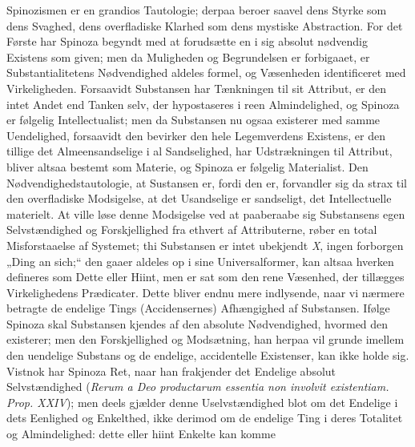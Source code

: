 \documentclass[12pt]{book}
\newcommand{\opage}[1]{\marginnote{\footnotesize\textit{[#1]}}}
\begin{document}
Spinozismen er en grandios Tautologie; derpaa beroer saavel dens Styrke som dens
Svaghed, dens overfladiske Klarhed som dens mystiske Abstraction. For det Første har
Spinoza begyndt med at forudsætte en i sig absolut nødvendig Existens som given; men da
Muligheden og Begrundelsen er forbigaaet, er Substantialitetens Nødvendighed aldeles
formel, og Væsenheden identificeret med Virkeligheden. Forsaavidt Substansen har
Tænkningen til sit Attribut, er den intet Andet end Tanken selv, der hypostaseres i
reen Almindelighed, og Spinoza er følgelig Intellectualist; men da Substansen nu ogsaa
existerer med samme Uendelighed, forsaavidt den bevirker den hele Legemverdens
Existens, er den tillige det Almeensandselige i al Sandselighed, har Udstrækningen
\opage{165} %
til Attribut, bliver altsaa bestemt som Materie, og Spinoza er følgelig Materialist.
Den Nødvendighedstautologie, at Sustansen er, fordi den er, forvandler sig da strax til
den overfladiske Modsigelse, at det Usandselige er sandseligt, det Intellectuelle
materielt. At ville løse denne Modsigelse ved at paaberaabe sig Substansens egen
Selvstændighed og Forskjellighed fra ethvert af Attributerne, røber en total
Misforstaaelse af Systemet; thi Substansen er intet ubekjendt \textit{X}, ingen
forborgen „Ding an sich;“ den gaaer aldeles op i sine Universalformer, kan altsaa
hverken defineres som Dette eller Hiint, men er sat som den rene Væsenhed, der tillægges
Virkelighedens Prædicater. Dette bliver endnu mere indlysende, naar vi nærmere betragte
de endelige Tings (Accidensernes) Afhængighed af Substansen. Ifølge Spinoza skal
Substansen kjendes af den absolute Nødvendighed, hvormed den existerer; men den
Forskjellighed og Modsætning, han herpaa vil grunde imellem den uendelige Substans og
de endelige, accidentelle Existenser, kan ikke holde sig. Vistnok har Spinoza Ret, naar
han frakjender det Endelige absolut Selvstændighed (\textit{Rerum a Deo productarum
essentia non involvit existentiam. Prop. XXIV}); men deels gjælder denne
Uselvstændighed blot om det Endelige i dets Eenlighed og Enkelthed, ikke derimod om de
endelige Ting i deres Totalitet og Almindelighed: dette eller hiint Enkelte kan komme
\end{document}
